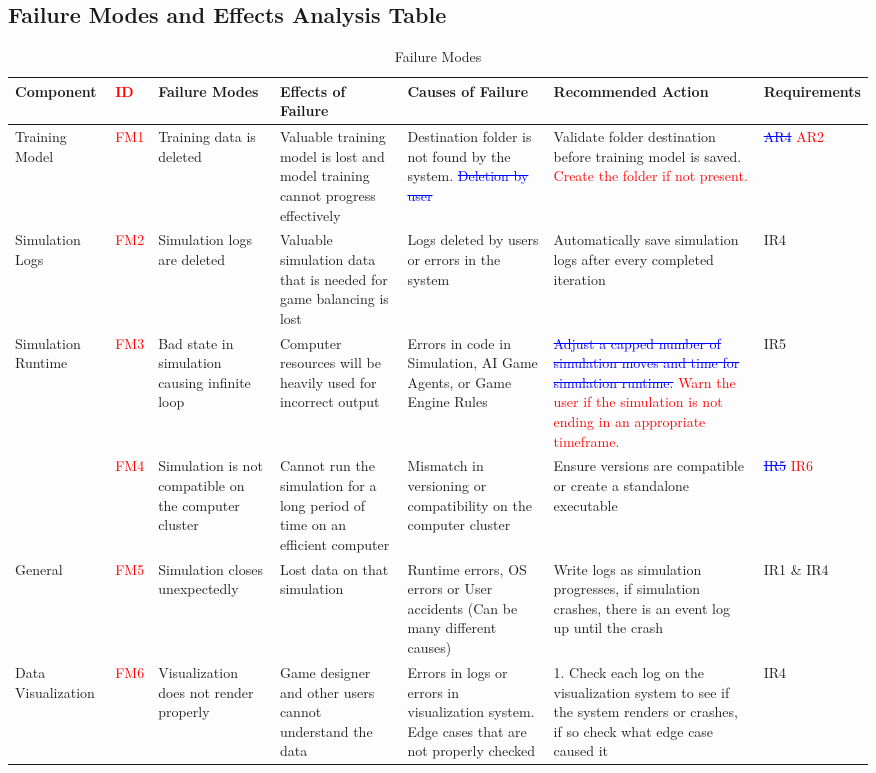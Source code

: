 \documentclass{article}
\begin{document}
\subsection{Failure Modes and Effects Analysis Table}
\begin{table}[H]
\begin{center}
    \caption{Failure Modes}
\end{center}
\begin{tabular}{| P{7em}| P{2em} | P{7em} | P{7em} | P{7em} | P{7em} | P{7em} |}
\hline
\textbf{Component} & \textbf{\textcolor{red}{ID}} & \textbf{Failure Modes} & \textbf{Effects of \mbox{Failure}} & \textbf{Causes of \mbox{Failure}} & \textbf{Recommended Action} & \textbf{Requirements}\\
\hline
 Training Model & \textcolor{red}{FM1} & Training data is deleted & Valuable training model is lost and model training cannot progress effectively & Destination folder is not found by the system. \textcolor{blue}{\sout{Deletion by user}} & Validate folder destination before training model is saved. \textcolor{red}{Create the folder if not present.} & \textcolor{blue}{\sout{AR4}} \textcolor{red}{AR2} \\
 \hline
 Simulation Logs & \textcolor{red}{FM2} & Simulation logs are deleted & Valuable simulation data that is needed for game balancing is lost & Logs deleted by users or errors in the system & Automatically save simulation logs after every completed iteration & IR4\\
 \hline
 Simulation Runtime & \textcolor{red}{FM3} & Bad state in simulation causing infinite loop & Computer resources will be heavily used for incorrect output & Errors in code in Simulation, AI Game Agents, or Game Engine Rules & \textcolor{blue}{\sout{Adjust a capped number of simulation moves and time for simulation runtime.}} \textcolor{red}{Warn the user if the simulation is not ending in an appropriate timeframe.} & IR5\\
 & \textcolor{red}{FM4} & Simulation is not compatible on the computer cluster & Cannot run the simulation for a long period of time on an efficient computer & Mismatch in versioning or compatibility on the computer cluster & Ensure versions are compatible or create a standalone executable & \textcolor{blue}{\sout{IR5}} \textcolor{red}{IR6} \\
 \hline
 General & \textcolor{red}{FM5} & Simulation closes unexpectedly & Lost data on that simulation& Runtime errors, OS errors or User accidents (Can be many different causes) & Write logs as simulation progresses, if simulation crashes, there is an event log up until the crash & IR1 \& IR4\\
 \hline
 Data Visualization & \textcolor{red}{FM6} & Visualization does not render properly & Game designer and other users cannot understand the data & Errors in logs or errors in visualization system. Edge cases that are not properly checked& 1. Check each log on the visualization system to see if the system renders or crashes, if so check what edge case caused it & IR4\\
 \hline

\end{tabular}
\end{table}
\end{document}
